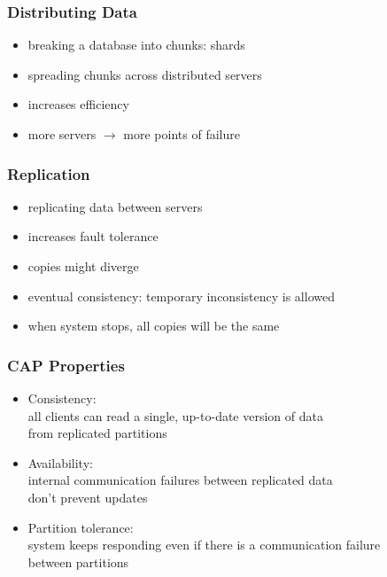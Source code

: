\documentclass[dvipsnames]{beamer}
\theoremstyle{plain}
\begin{document}
\begin{frame}
  \frametitle{Distributing Data}

  \begin{itemize}
    \item breaking a database into chunks: \alert{shards}
    \item spreading chunks across distributed servers

    \medskip
    \item increases efficiency
    \item more servers $\rightarrow$ more points of failure
  \end{itemize}
\end{frame}

\begin{frame}
  \frametitle{Replication}

  \begin{itemize}
    \item replicating data between servers
    \item increases fault tolerance

    \medskip
    \item copies might diverge
    \item \alert{eventual consistency}: temporary inconsistency is allowed
    \item when system stops, all copies will be the same
  \end{itemize}
\end{frame}

\begin{frame}
  \frametitle{CAP Properties}

  \begin{itemize}
    \item \alert{C}onsistency:\\
      all clients can read a single, up-to-date version of data\\
      from replicated partitions

    \medskip
    \item \alert{A}vailability:\\
      internal communication failures between replicated data\\
      don't prevent updates

    \medskip
    \item \alert{P}artition tolerance:\\
      system keeps responding even if there is a communication failure\\
      between partitions
  \end{itemize}
\end{frame}
\end{document}
